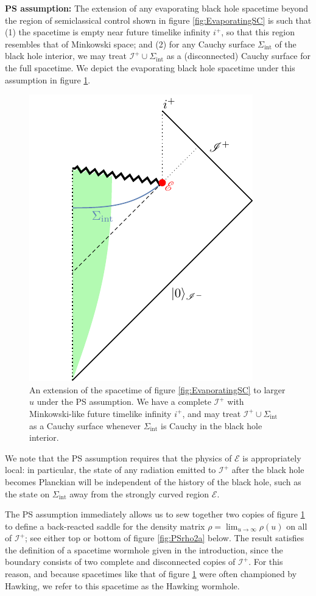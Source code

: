 \documentclass[letterpaper,12pt]{article}
\newenvironment{emphblock}%
  {\list{}{\leftmargin=0.22in\rightmargin=0.3in}\item[]}%
  {\endlist}
\newcommand*{\scri}{\mathscr{I}} %
\newcommand*{\evap}{\mathscr{E}} %
\begin{document}
\begin{emphblock}
	\textbf{PS assumption:} The extension of any evaporating black hole spacetime beyond the region of semiclassical control shown in figure \ref{fig:EvaporatingSC} is such that (1) the spacetime is empty near future timelike infinity $i^+$, so that this region resembles that of Minkowski space; and (2) for any Cauchy surface $\Sigma_\mathrm{int}$ of the black hole interior, we may treat $\scri^+ \cup \Sigma_\mathrm{int}$ as a (disconnected) Cauchy surface for the full spacetime.%
\end{emphblock}
We depict the evaporating black hole spacetime under this assumption in figure \ref{fig:Evaporating}.
\begin{figure}
\centering
	\includegraphics[width=.3\textwidth]{Evaporate2.pdf}
\caption{An extension of the spacetime of figure \ref{fig:EvaporatingSC} to larger $u$ under the PS assumption. We have a complete $\scri^+$ with Minkowski-like future timelike infinity $i^+$, and may treat $\scri^+ \cup \Sigma_\mathrm{int}$ as a Cauchy surface whenever  $\Sigma_\mathrm{int}$ is Cauchy in the black hole interior.  \label{fig:Evaporating}}
\end{figure}
We note that the PS assumption requires that the physics of $\evap$ is appropriately local: in particular, the state of any radiation emitted to $\scri^+$ after the black hole becomes Planckian will be independent of the history of the black hole, such as the state on $\Sigma_\mathrm{int}$ away from the strongly curved region $\evap$.


The PS assumption immediately allows us to sew together two copies of figure \ref{fig:Evaporating} to define a back-reacted saddle for the density matrix $\rho = \lim_{u\rightarrow \infty}\rho(u)$ on all of $\scri^+$; see either top or bottom of figure \ref{fig:PSrho2a} below. The result satisfies the definition of a spacetime wormhole given in the introduction, since the boundary consists of two complete and disconnected copies of $\scri^+$. For this reason, and because spacetimes like that of figure \ref{fig:Evaporating} were often championed by Hawking,  we refer to this spacetime as the Hawking wormhole.
\end{document}
